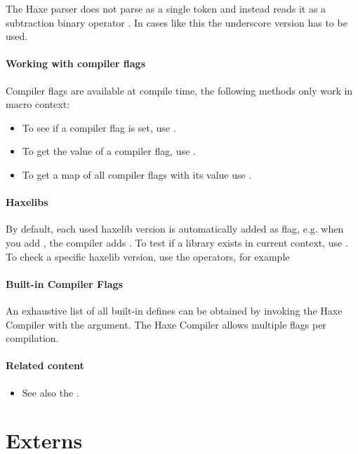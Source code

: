 The Haxe parser does not parse  as a single token and instead reads it as a subtraction binary operator . In cases like this the underscore version  has to be used.

\paragraph{Working with compiler flags}
Compiler flags are available at compile time, the following methods only work in macro context:
\begin{itemize}
	\item To see if a compiler flag is set, use .
	\item To get the value of a compiler flag, use .
	\item To get a map of all compiler flags with its value use .
\end{itemize}

\paragraph{Haxelibs}
By default, each used haxelib version is automatically added as flag, e.g. when you add , the compiler adds . To test if a library exists in current context, use . To check a specific haxelib version, use the operators, for example 

\paragraph{Built-in Compiler Flags}
An exhaustive list of all built-in defines can be obtained by invoking the Haxe Compiler with the  argument. The Haxe Compiler allows multiple  flags per compilation.

\paragraph{Related content}
\begin{itemize}
	\item See also the .
\end{itemize}


\section{Externs}
\label{lf-externs}

